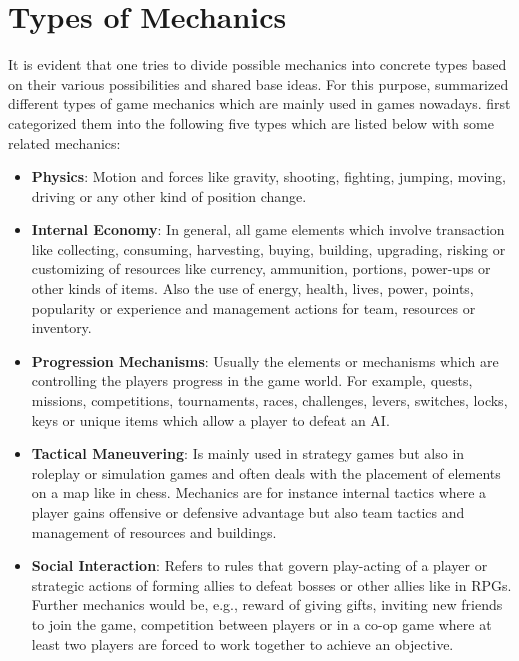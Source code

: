 \documentclass[MGS,Master,english]{twbook}%
\begin{document}
\section{Types of Mechanics}
It is evident that one tries to divide possible mechanics into concrete types based on their various possibilities and shared base ideas. For this purpose, \citep{gameDesign::gameMechanicsAdvancedGameDesign} summarized different types of game mechanics which are mainly used in games nowadays.  first categorized them into the following five types which are listed below with some related mechanics:
\begin{itemize}
	\item \textbf{Physics}: Motion and forces like gravity, shooting, fighting, jumping, moving, driving or any other kind of position change. \cite{gameDesign::gameMechanicsAdvancedGameDesign}
	\item \textbf{Internal Economy}: In general, all game elements which involve transaction like collecting, consuming, harvesting, buying, building, upgrading, risking or customizing of resources like currency, ammunition, portions, power-ups or other kinds of items. Also the use of energy, health, lives, power, points, popularity or experience and management actions for team, resources or inventory. \cite{gameDesign::gameMechanicsAdvancedGameDesign}
	\item \textbf{Progression Mechanisms}: Usually the elements or mechanisms which are controlling the players progress in the game world. For example, quests, missions, competitions, tournaments, races, challenges, levers, switches, locks, keys or unique items which allow a player to defeat an \ac{AI}. \cite{gameDesign::gameMechanicsAdvancedGameDesign}
	\item \textbf{Tactical Maneuvering}: Is mainly used in strategy games but also in roleplay or simulation games and often deals with the placement of elements on a map like in chess. Mechanics are for instance internal tactics where a player gains offensive or defensive advantage but also team tactics and management of resources and buildings. \cite{gameDesign::gameMechanicsAdvancedGameDesign}
	\item \textbf{Social Interaction}: Refers to rules that govern play-acting of a player or strategic actions of forming allies to defeat bosses or other allies like in \acp{RPG}. Further mechanics would be, e.g., reward of giving gifts, inviting new friends to join the game, competition between players or in a co-op game where at least two players are forced to work together to achieve an objective. \cite{gameDesign::gameMechanicsAdvancedGameDesign}
\end{itemize}
\end{document}
